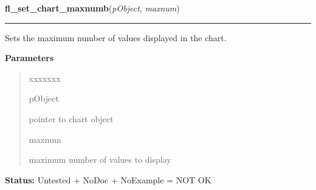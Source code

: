 \hspace{.8\funcindent}\begin{boxedminipage}{\funcwidth}

    \raggedright \textbf{fl\_set\_chart\_maxnumb}(\textit{pObject}, \textit{maxnum})

    \vspace{-1.5ex}

    \rule{\textwidth}{0.5\fboxrule}
\setlength{\parskip}{2ex}
    Sets the maximum number of values displayed in the chart.

\setlength{\parskip}{1ex}
      \textbf{Parameters}
      \vspace{-1ex}

      \begin{quote}
        \begin{Ventry}{xxxxxxx}

          \item[pObject]

          pointer to chart object

          \item[maxnum]

          maximum number of values to display

        \end{Ventry}

      \end{quote}

\textbf{Status:} Untested + NoDoc + NoExample = NOT OK



    \end{boxedminipage}

    \label{xformslib:library:fl_set_chart_autosize}

    \vspace{0.5ex}

